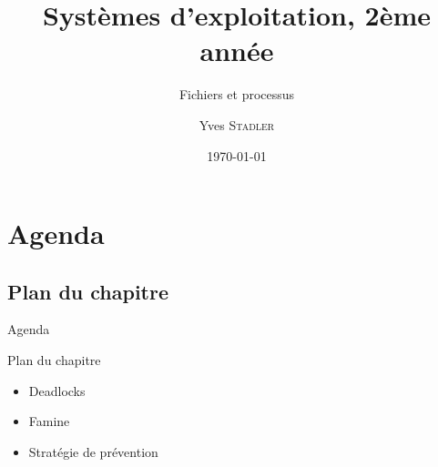 
\title{Systèmes d'exploitation, 2ème année}
\subtitle{Fichiers et processus}

\author{Yves \textsc{Stadler}}

\date{\today}




\begin{frame}
\titlepage
\end{frame}

\def\sectitle{Agenda}
\section{\sectitle}
\def\subsectitle{Plan du chapitre}
\subsection{\subsectitle}

\begin{frame}{\sectitle}
\begin{block}{\subsectitle}
\begin{itemize}
\item Deadlocks
\item Famine
\item Stratégie de prévention
\end{itemize}
\end{block}
\end{frame}


\def\sectitle{Deadlock}
